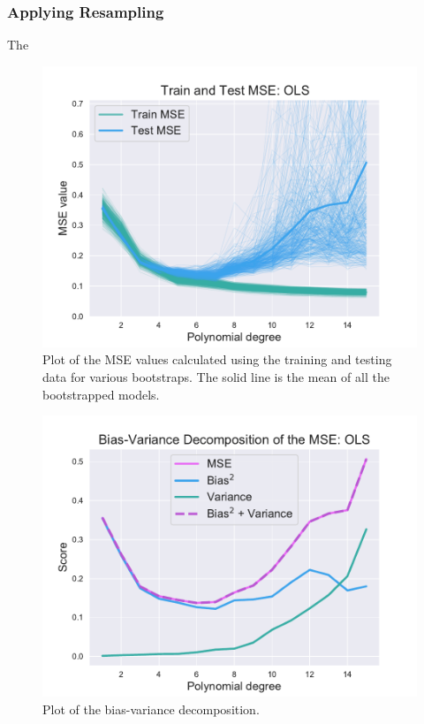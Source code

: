 \documentclass[twocolumn,english,notitlepage]{article}
\begin{document}
        \subsubsection*{Applying Resampling}
        The 
            \begin{figure}[ht]
                \centering
                \includegraphics[width=\linewidth]{BS_train_test_mse_OLS.pdf}
                \caption{Plot of the MSE values calculated using the training and testing data for various bootstraps. The solid line is the mean of all the bootstrapped models.}
                \label{res:fig:train_test_ols}
            \end{figure}

            \begin{figure}[H]
                \centering
                \includegraphics[width=\linewidth]{BS_Bias_var_decomp_OLS.pdf}
                \caption{Plot of the bias-variance decomposition. }
                \label{res:fig:OLS_bias_variance_tradeoff_ols}
            \end{figure}
\end{document}
